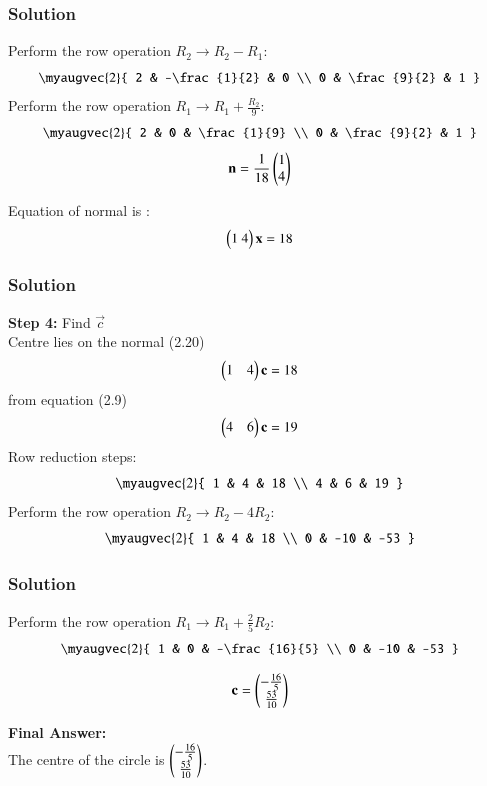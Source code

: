 \documentclass{beamer}
\numberwithin{equation}{section}
\begin{document}
\begin{frame}[fragile]
    \frametitle{Solution}
Perform the row operation \( R_2 \to R_2 - R_1\):
\begin{equation}
\myaugvec{2}{
2 & -\frac{1}{2} & 0 \\
0 & \frac{9}{2} & 1
}
\end{equation}
Perform the row operation \( R_1 \to R_1 + \frac{R_2}{9}\):
\begin{equation}
\myaugvec{2}{
2 & 0 & \frac{1}{9} \\
0 & \frac{9}{2} & 1
}
\end{equation}
\begin{equation}
\mathbf{n}=\frac{1}{18}\begin{pmatrix}1 \\ 4\end{pmatrix}
\end{equation}

Equation of normal is :
\begin{equation}
\myvec{1 \ 4}\vec{x} = 18
\end{equation}
\end{frame}
\begin{frame}[fragile]
    \frametitle{Solution}
\textbf{Step 4:} Find $\vec{c}$\\

Centre lies on the normal (2.20)
\begin{equation}
\begin{pmatrix}1 & 4\end{pmatrix}\mathbf{c} = 18
\end{equation}
from equation (2.9)
\begin{equation}
\begin{pmatrix}4 & 6\end{pmatrix}\mathbf{c} = 19
\end{equation}
Row reduction steps:
\begin{equation}
\myaugvec{2}{
1 & 4 & 18 \\
4 & 6 & 19
}
\end{equation}
Perform the row operation \( R_2 \to R_2 - 4R_2\):
\begin{equation}
\myaugvec{2}{
1 & 4 & 18 \\
0 & -10 & -53
}
\end{equation}
\end{frame}
\begin{frame}[fragile]
    \frametitle{Solution}
Perform the row operation \( R_1 \to R_1 +\frac{2}{5}R_2\):
\begin{equation}
\myaugvec{2}{
1 & 0 & -\frac{16}{5} \\
0 & -10 & -53
}
\end{equation}

\begin{equation}
\mathbf{c} = \begin{pmatrix} -\frac{16}{5} \\ \frac{53}{10} \end{pmatrix}
\end{equation}

\textbf{Final Answer:}\\
The centre of the circle is $\begin{pmatrix} -\frac{16}{5} \\ \frac{53}{10} \end{pmatrix}$.

\end{frame}
\end{document}
